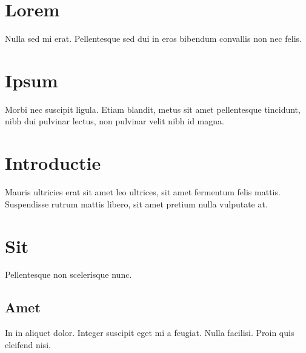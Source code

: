 \documentclass{article}
\begin{document}
    \tableofcontents
    \newpage

    \section{Lorem}
    Nulla sed mi erat. Pellentesque sed dui in eros bibendum convallis non nec felis. 

    \section{Ipsum}

    Morbi nec suscipit ligula. Etiam blandit, metus sit amet pellentesque tincidunt, nibh dui
    pulvinar lectus, non pulvinar velit nibh id magna.

    \section[Intro]{Introductie}

    Mauris ultricies erat sit amet leo ultrices, sit amet fermentum felis mattis. Suspendisse rutrum
    mattis libero, sit amet pretium nulla vulputate at.

    \section{Sit}

    Pellentesque non scelerisque nunc. 

    \subsection{Amet}

    In in aliquet dolor. Integer suscipit eget mi a feugiat. Nulla facilisi. Proin quis eleifend
    nisi. 
\end{document}

